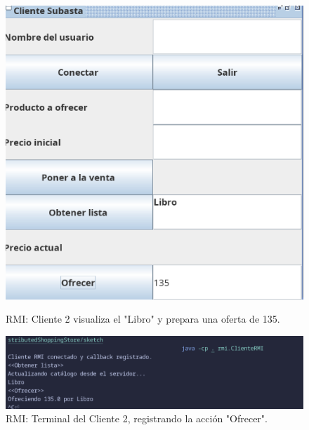 \documentclass[11pt, a4paper]{article}
\begin{document}
\begin{figure}[h!]
    \centering
    \begin{minipage}{0.48\textwidth}
        \centering
        \includegraphics[width=\linewidth]{media/rmi-screenshots/Offer-Client2.png}
        \caption{RMI: Cliente 2 visualiza el 
"Libro" y prepara una oferta de 135.}
        \label{fig:rmi_oferta_gui}
    \end{minipage}\hfill
    \begin{minipage}{0.48\textwidth}
        \centering
        \includegraphics[width=\linewidth]{media/rmi-screenshots/Offer-Terminal-Client2.png}
        \caption{RMI: Terminal del Cliente 2, registrando la acción "Ofrecer".}
        \label{fig:rmi_oferta_term}
    \end{minipage}
\end{figure}
\end{document}
